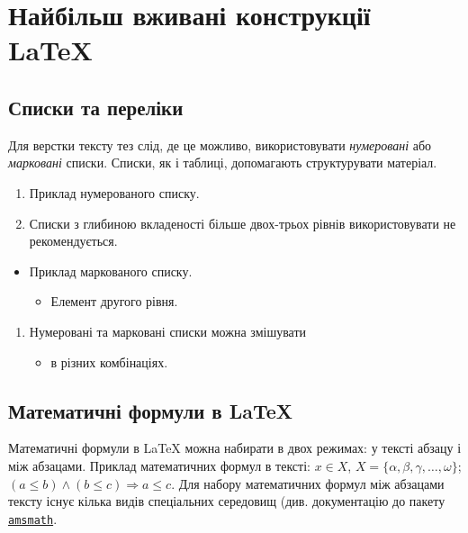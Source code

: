 \documentclass[]{iptconf}
\begin{document}
\section{Найбільш вживані конструкції \LaTeX}

\subsection{Списки та переліки}

Для верстки тексту тез слід, де це можливо, використовувати \emph{нумеровані} або
\emph{марковані} списки. Списки, як і таблиці, допомагають структурувати матеріал.
\begin{enumerate}
	\item Приклад нумерованого списку.
	\item Списки з глибиною вкладеності більше двох-трьох рівнів використовувати не рекомендується.
\end{enumerate}

\begin{itemize}
	\item Приклад маркованого списку.
	      \begin{itemize}
		      \item Елемент другого рівня.
	      \end{itemize}
\end{itemize}

\begin{enumerate}
	\item Нумеровані та марковані списки можна змішувати
	      \begin{itemize}
		      \item в різних комбінаціях.
	      \end{itemize}
\end{enumerate}

\subsection{Математичні формули в \LaTeX}

Математичні формули в \LaTeX{} можна набирати в двох режимах: у тексті абзацу і між абзацами.
Приклад математичних формул в тексті: $x \in X$, $X = \{\alpha, \beta, \gamma, \dots,
	\omega\}$; $(a \le b) \wedge (b \le c) \Rightarrow a \le c$. Для набору математичних формул
між абзацами тексту існує кілька видів спеціальних середовищ (див. документацію до пакету
\href{http://mirror.ctan.org/macros/latex/required/amslatex/math/amsldoc.pdf}{\texttt{amsmath}}.
\end{document}

